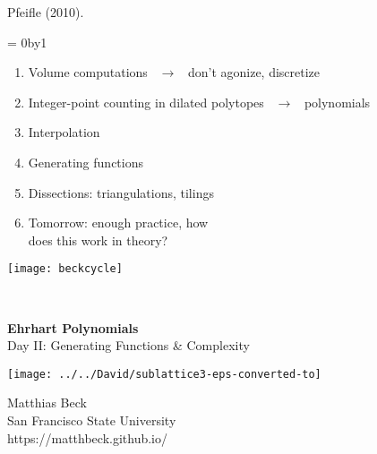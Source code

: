 \documentclass[landscape]{foils}
\def\mybullet{\green $\blacktriangleright$ \black}
\newcounter{frozenpage}
\def\thawpage{
  \count0=\thefrozenpage
  \advance\count0by1
  \renewcommand{\thepage}{\the\count0}
}
\def\green{\color{green}}
\def\blue{\color{blue}}
\def\black{\color{black}}
\def\bm{\blue $}
\def\em{$ \black }
\begin{document}
\vspace{-.35in}
\hspace{5in}
Pfeifle (2010).

\thawpage

\foilhead{\green Recap Day I}

\vspace{-.2in}
\begin{enumerate}[\mybullet]
\item Volume computations \ \bm \longrightarrow \em \ don't agonize, discretize 
\item Integer-point counting in dilated polytopes \ \bm \longrightarrow \em \
polynomials
\item Interpolation
\item Generating functions
\item Dissections: triangulations, tilings
\item Tomorrow: enough practice, how \\ does this work in theory?
\end{enumerate}

\vspace{-3.2in}
\hspace{5.7in}
\texttt{[image: beckcycle]}

\vspace{-3in}
\hspace{8.4in}
\tiny
{}

\normalsize




\newpage
\thispagestyle{empty}
\

\begin{center}
  {\green\LARGE \textbf{Ehrhart Polynomials} \\[12pt]
\normalsize
Day II: Generating Functions \& Complexity}
\end{center}

\vspace{-.2in}
\texttt{[image: ../../David/sublattice3-eps-converted-to]}

\vspace{-4.5in} 
\blue
\hspace{5in}
Matthias Beck
\\[5pt]
\black
\hspace{5in}
San Francisco State University
\\[5pt]
\blue
\hspace{5in}
https://matthbeck.github.io/
\black
\end{document}
